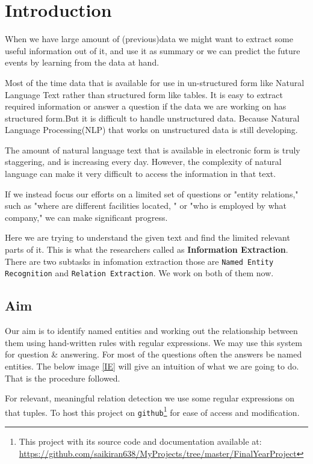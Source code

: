 \documentclass[12pt]{report}
\begin{document}
\pagestyle{empty} %
\tableofcontents %
\cleardoublepage %
\pagestyle{plain} %
\setcounter{page}{1} %

\chapter{Introduction}
\par When we have large amount of (previous)data we might want to extract some useful information
 out of it, and use it as summary or we can predict the future events by learning from the
 data at hand.
\par Most of the time data that is available for use in un-structured form like Natural Language Text
rather than structured form like tables. It is easy to extract required information or 
answer a question if the data we are working on has structured form.But it is difficult to handle unstructured data. Because Natural Language Processing(NLP)
that works on unstructured data is still developing.
\par The amount of natural language text that is available in electronic 
form is truly staggering, and is increasing every day. 
However, 
the complexity of natural language can make it very difficult to access the information in that text\cite{BookIE}.
\par If we instead focus our efforts on a limited set of questions or 
"entity relations," such as "where are different facilities located,
" or "who is employed by what company," we can make significant progress.\cite{BookIE}
\par Here we are trying to understand the given text and find the limited relevant parts of it.
 This is what the researchers called as \textbf{Information Extraction}. There are two
  subtasks in infomation extraction those are \texttt{Named Entity Recognition} and \texttt{Relation Extraction}. We work on both of them now.
\section{Aim}
\par Our aim is to identify named entities and working out the relationship between them using hand-written
 rules with regular expressions. We may use this system for question \& answering. For most of the questions often the answers be named entities.
The below image \ref{IE} will give an intuition of what we are going to do. That is the procedure followed. 
\par For relevant, meaningful relation detection we use some regular expressions on that tuples.
To host this project on \texttt{github}\footnote{This project with its source code and documentation available at: \url{https://github.com/saikiran638/MyProjects/tree/master/FinalYearProject}} for ease of access and modification.
\end{document}
